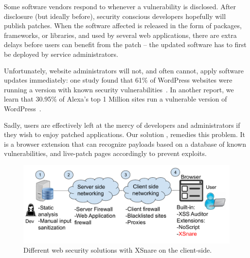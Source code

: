 Some software vendors respond to \xss whenever a vulnerability is disclosed.
After disclosure (but ideally before), security conscious developers hopefully will publish patches. When the software affected is released in the form of
packages, frameworks, or libraries, and used by several web applications,
there are extra delays before users can benefit from the patch -- the updated software has to first be deployed by service administrators.

Unfortunately, website administrators will not, and often cannot,
apply software updates immediately: one study found
that 61\% of WordPress websites were running a version with known
security vulnerabilities~\cite{Sucuri}. In another report, we learn
that 30.95\% of Alexa's top 1 Million sites run a vulnerable version
of WordPress~\cite{wpwhitesecurity}.

Sadly, users are effectively left at the mercy of developers and
administrators if they wish to enjoy patched applications. Our
solution \sys, remedies this problem. It is a browser extension that
can recognize \xss payloads based on a database of known
vulnerabilities, and live-patch pages accordingly to prevent exploits.


\begin{figure}[h]
  \includegraphics[scale=0.37]{img/web_app_architecture_one.pdf}
  \vspace*{-5.0ex}
  \caption{Different web security solutions with XSnare on the client-side.}
  \label{fig:web_architecture}
\end{figure}

